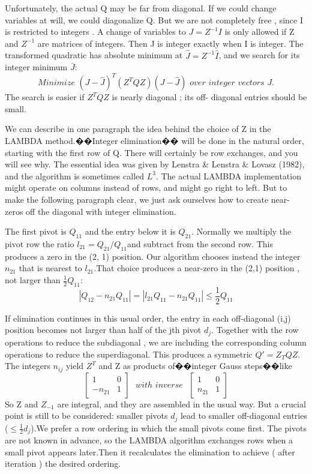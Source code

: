 Unfortunately, the actual Q may be far from diagonal. If we could change variables at will, we could diagonalize Q. But we are not completely free , since I is restricted to integers . A change of variables to $J=Z^{-1}I$ is only allowed if Z and $Z^{-1}$ are matrices of integers. Then J is integer exactly when I is integer. The transformed quadratic has absolute minimum at $\hat{J}=Z^{-1}\hat{I}$, and we search for its integer minimum $\bar{J}$:
\begin{equation}
Minimize\,\,(J-\hat{J})^{T}(Z^{T}QZ)(J-\hat{J})\,\,over\,\, integer\,\, vectors\,\,J.
\end{equation}
The search is easier if $Z^{T}QZ$ is nearly diagonal ; its off- diagonal entries should be small.

We can describe in one paragraph the idea behind the choice of Z in the LAMBDA method.��Integer elimination�� will be done in the natural order, starting with the first row of Q. There will certainly be row exchanges, and you will see why. The essential idea was given by Lenstra \& Lenstra \& Lovasz (1982), and the algorithm is sometimes called $L^{3}$. The actual LAMBDA implementation might operate on columns instead of rows, and might go right to left. But to make the following paragraph clear, we just ask ourselves how to create near-zeros off the diagonal with integer elimination.

The first pivot is $Q_{11}$ and the entry below it is $Q_{21}$. Normally we multiply the pivot row the ratio $l_{21}=Q_{21}/Q_{11}$and subtract from the second row. This produces a zero in the (2, 1) position. Our algorithm chooses instead the integer $n_{21}$ that is nearest to $l_{21}$.That choice produces a near-zero in the (2,1) position , not larger than $\frac{1}{2}Q_{11}$:
\begin{equation}
|Q_{12}-n_{21}Q_{11}|=|l_{21}Q_{11}-n_{21}Q_{11}| \leq \frac{1}{2}Q_{11}
\end{equation}

If elimination continues in this usual order, the entry in each off-diagonal (i,j) position
becomes not larger than half of the jth pivot $d_{j}$. Together with the row operations to reduce the subdiagonal , we are including the corresponding column operations to reduce the superdiagonal. This produces a symmetric $Q'=Z_{T}QZ$. The integers $n_{ij}$ yield $Z^{T}$ and Z as products of��integer Gauss steps��like
$$
\begin{bmatrix}
1&0\\
-n_{21}&1
\end{bmatrix}
\,\,\,\,
with \,\, inverse \,\,\,\,
\begin{bmatrix}
1&0\\
n_{21}&1
\end{bmatrix}
$$
So Z and $Z_{-1}$ are integral, and they are assembled in the usual way. But a crucial point is still to be considered: smaller pivots $d_{j}$ lead to smaller off-diagonal entries ($\leq\frac{1}{2}d_{j}$).We prefer a row ordering in which the small pivots come first. The pivots are not known in advance, so the LAMBDA algorithm exchanges rows when a small pivot appears later.Then it recalculates the elimination to achieve ( after iteration ) the desired ordering.

